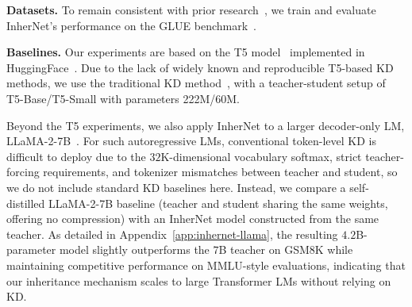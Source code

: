 \documentclass{article} %
\begin{document}
\textbf{Datasets.} To remain consistent with prior research~\citep{raffel2019exploring}, we train and evaluate InherNet's performance on the GLUE benchmark~\citep{wang2018glue}.






\textbf{Baselines.} Our experiments are based on the T5 model~\citep{raffel2019exploring} implemented in HuggingFace~\citep{wolf-etal2020transformers}. Due to the lack of widely known and reproducible T5-based KD methods, we use the traditional KD method~\citep{hinton2015distilling}, with a teacher-student setup of T5-Base/T5-Small with parameters 222M/60M.

Beyond the T5 experiments, we also apply InherNet to a larger decoder-only LM, LLaMA-2-7B~\cite{raffel2019exploring,touvron2023llama}. For such autoregressive LMs, conventional token-level KD is difficult to deploy due to the $32$K-dimensional vocabulary softmax, strict teacher-forcing requirements, and tokenizer mismatches between teacher and student, so we do not include standard KD baselines here. Instead, we compare a self-distilled LLaMA-2-7B baseline (teacher and student sharing the same weights, offering no compression) with an InherNet model constructed from the same teacher. As detailed in Appendix~\ref{app:inhernet-llama}, the resulting $4.2$B-parameter model slightly outperforms the $7$B teacher on GSM8K while maintaining competitive performance on MMLU-style evaluations, indicating that our inheritance mechanism scales to large Transformer LMs without relying on KD.




\end{document}
